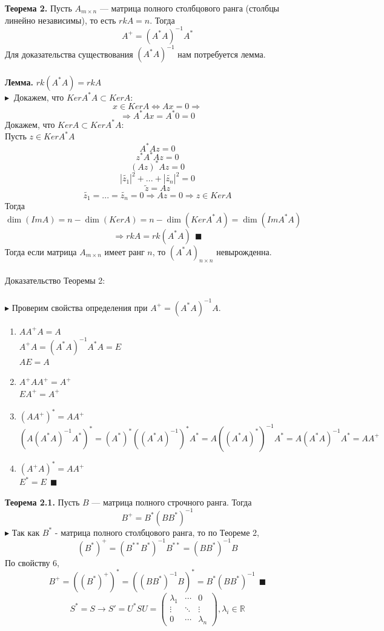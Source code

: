 \documentclass[12pt]{article}
\theoremstyle{definition}
\numberwithin{equation}{section}
\begin{document}
	\textbf{Теорема 2.}
	Пусть $A_{m \times n}$ --- матрица полного столбцового ранга (столбцы линейно независимы), то есть $rkA=n$. Тогда $$A^+=(A^*A)^{-1}A^*$$
	Для доказательства существования $(A^*A)^{-1}$ нам потребуется лемма.\\\\
	\textbf{Лемма.}
	$rk(A^*A)=rkA$\\
	$\blacktriangleright ~$ 
	Докажем, что $Ker A^*A\subset Ker A$:
	$$x\in Ker A \Leftrightarrow Ax=0\Rightarrow$$
	$$\Rightarrow A^*Ax=A^* {0}=0$$
	Докажем, что $Ker A\subset Ker A^*A$:\\
	Пусть $z\in Ker A^*A$\\
	$$A^*Az=0$$
	$$z^*A^*Az=0$$
	$$(Az)^*Az=0$$
	$$|\tilde{z_1}|^2+...+|\tilde{z_n}|^2=0$$
	$$\tilde{z}=Az$$
	$$\tilde{z_1}=...=\tilde{z_n}=0 \Rightarrow Az=0 \Rightarrow z\in Ker A$$
	Тогда $\dim(Im A)= n - \dim(Ker A) = n - \dim(Ker A^*A) =\dim(Im A^*A)$\\
	$$\Rightarrow rk A = rk (A^*A) ~~ \blacksquare$$
	Тогда если матрица $A_{m\times n}$ имеет ранг $n$, то $(A^*A)_{n\times n}$ невырожденна.\\\\
	Доказательство Теоремы 2:\\\\
	$\blacktriangleright$ Проверим свойства определения при $A^+=(A^*A)^{-1}A$.
	\begin{enumerate}
		\item $AA^+A=A$\\
		$A^+A=(A^*A)^{-1}A^*A=E$\\
		$AE=A$
		\item $A^+AA^+=A^+$\\
		$EA^+=A^+$
		\item $(AA^+)^*=AA^+$\\
		$(A(A^*A)^{-1}A^*)^*=(A^*)^*((A^*A)^{-1})^*A^*=A((A^*A)^*)^{-1}A^*=A(A^*A)^{-1}A^*=AA^+$
		\item $(A^+A)^*=AA^+$\\
		$E^*=E ~~\blacksquare$\\
	\end{enumerate}
	\textbf{Теорема 2.1.}
	Пусть $B$ --- матрица полного строчного ранга. Тогда $$B^+=B^*(BB^*)^{-1}$$
	$\blacktriangleright$ 
	Так как $B^*$ - матрица полного столбцового ранга, то по Теореме 2,\\
	$$(B^*)^+=(B^{**}B^*)^{-1}B^{**}
	=(BB^*)^{-1}B$$
	По свойству 6,
	$$B^+=((B^*)^+)^*=((BB^*)^{-1}B)^*=B^*(BB^*)^{-1} ~~ \blacksquare$$
	\newpage
	\[S^*=S \to S'=U^*SU = \begin{pmatrix}
	\lambda_1 & \cdots & 0 \\         
	\vdots & \ddots & \vdots \\
	0 & \cdots & \lambda_n
	\end{pmatrix}, \lambda_i \in \mathbb{R}\]
\end{document}
